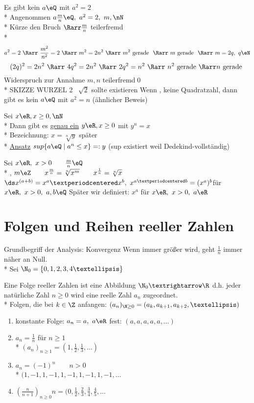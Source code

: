 Es gibt kein $a\eQ$ mit $a^2=2$\\*
\bew
Angenommen $a\frac{m}{n}\eQ,\ a^2=2,\ m,\nN$\\*
Kürze den Bruch $\Rarr \frac{m}{n}$ teilerfremd\\*
$$a^2=2\ \Rarr\ \frac{m^2}{n^2}=2 \ \Rarr\ m^2=2n^2 \ \Rarr\ m^2 \text{ gerade } \ \Rarr\ m \text{ gerade } \ \Rarr\ m=2q,\ q\eN$$
$$(2q)^2=2n^2 \ \Rarr\ 4q^2=2n^2 \ \Rarr\ 2q^2=n^2 \ \Rarr\  n^2 \text{ gerade } \Rarr n \text{ gerade }$$
Widerspruch zur Annahme $m,n$ teilerfremd\qed\\*
SKIZZE WURZEL 2 \Rarr\ $\sqrt{2}$ sollte existieren %
\bem
Wenn \nN, keine Quadratzahl, dann gibt es kein $a\eQ$ mit $a^2=n$ (ähnlicher Beweis)

Sei $x\eR, x\geq 0, \nN$\\*
Dann gibt es \ul{genau ein} $y\eR, x\geq 0$ mit $y^n=x$\\*
Bezeichnung: $x=\sqrt[n]{y}$
\bew
später\\*
\ul{Ansatz} $sup\{a\eQ\mid a^n\leq x\}=:y$ (sup existiert weil \R{} Dedekind-vollständig)

Sei $x\eR,\ x>0\qquad \frac{m}{n}\eQ$\\*
\nN, $m\eZ\qquad x^{\frac{m}{n}}=\sqrt[n]{x^m}\qquad x^{\frac{1}{n}}=\sqrt[n]{x}$
$\ds x^{(a+b)}=x^a·x^b,\ x^{a·b}=(x^a)^b$\hfill für $x\eR,\ x>0,\ a,b\eQ$
\bem
Später wir definiert: $x^a$ für $x\eR,\ x>0,\ a\eR$

\chapter{Folgen und Reihen reeller Zahlen}
Grundbegriff der Analysis: Konvergenz
\bsp
Wenn \nN{} immer größer wird, geht $\frac{1}{n}$ immer näher an Null.\\*
Sei $\N_0=\{0,1,2,3,4…\}$

Eine Folge reeller Zahlen ist eine Abbildung $\N_0→\R$ d.h. jeder natürliche Zahl $n\geq 0$ wird eine reelle Zahl $a_n$ zugeordnet.\\*
Folgen, die bei $k\in\Z$ anfangen: $(a_n)_{\N\geq 0}=(a_k,a_{k+1},a_{k+2},…)$
\bsp
\begin{enumerate}
\item{konstante Folge: $a_n=a,\ a\eR$ fest: $(a,a,a,a,a,…)$}
\item{$a_n=\frac{1}{n}$ für $n\geq 1$\\*
$(a_n)_{n\geq 1}=(1,\frac{1}{2},\frac{1}{3},…)$}
\item{$a_n=(-1)^n\qquad n>0$\\*
$(1,-1,1,-1,1,-1,1,-1,1,-1,…$}
\item{$(\frac{n}{n+1})_{n\geq 0}n=(0,\frac{1}{2},\frac{2}{3},\frac{3}{4},\frac{4}{5},…$}
\end{enumerate}

